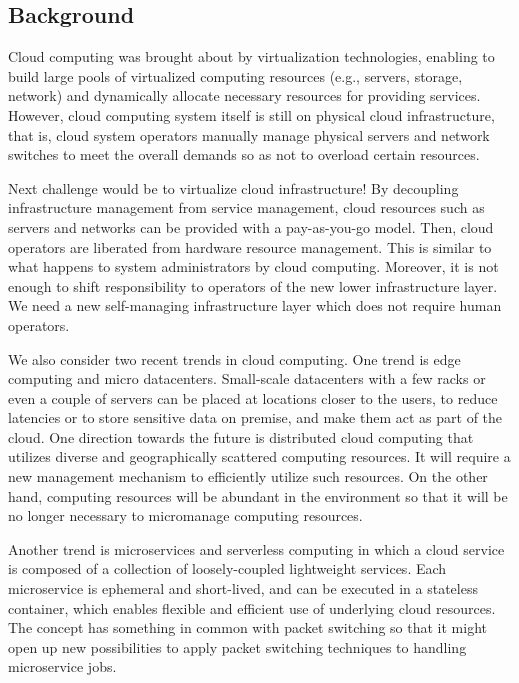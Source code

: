 \subsection{Background}

Cloud computing was brought about by virtualization technologies,
enabling to build large pools of virtualized computing resources (e.g.,
servers, storage, network) and dynamically allocate necessary resources
for providing services.
However, cloud computing system itself is still on physical cloud
infrastructure, that is, cloud system operators manually manage
physical servers and network switches to meet the overall demands
so as not to overload certain resources.

Next challenge would be to virtualize cloud infrastructure!
By decoupling infrastructure management from service management,
cloud resources such as servers and networks can be provided with a
pay-as-you-go model.
Then, cloud operators are liberated from hardware resource management.
This is similar to what happens to system administrators by cloud
computing.
Moreover, it is not enough to shift responsibility to operators of the
new lower infrastructure layer. We need a new self-managing
infrastructure layer which does not require human operators.

We also consider two recent trends in cloud computing.
One trend is edge computing and micro datacenters.
Small-scale datacenters with a few racks or even a couple of servers
can be placed at locations closer to the users, to reduce latencies
or to store sensitive data on premise, and make them act as part of
the cloud.
One direction towards the future is distributed cloud computing that
utilizes diverse and geographically scattered computing resources.
It will require a new management mechanism to efficiently utilize such
resources.
On the other hand, computing resources will be abundant in the
environment so that it will be no longer necessary to micromanage
computing resources.

Another trend is microservices and serverless computing in which
a cloud service is composed of a collection of loosely-coupled
lightweight services.
Each microservice is ephemeral and short-lived, and can be executed
in a stateless container,
which enables flexible and efficient use of underlying cloud
resources.
The concept has something in common with packet switching so that
it might open up new possibilities to apply packet switching
techniques to handling microservice jobs.

